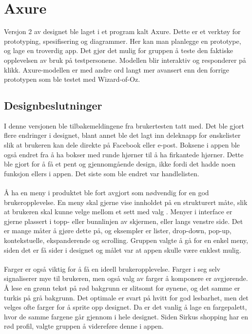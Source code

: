\section{\textcolor[HTML]{D32F2F}{Axure}}
Versjon 2 av designet ble laget i et program kalt Axure. Dette er et verktøy for prototyping, spesifisering og diagrammer. Her kan man planlegge en prototype, og lage en troverdig app. Det gjør det mulig for gruppen å teste den faktiske opplevelsen av bruk på testpersonene. Modellen blir interaktiv og responderer på klikk. Axure-modellen er med andre ord langt mer avansert enn den forrige prototypen som ble testet med Wizard-of-Oz.

\subsection{Designbeslutninger}
I denne versjonen ble tilbakemeldingene fra brukertesten tatt med. Det ble gjort flere endringer i designet, blant annet ble det lagt inn deleknapp for ønskelister slik at brukeren kan dele direkte på Facebook eller e-post. Boksene i appen ble også endret fra å ha bokser med runde hjørner til å ha firkantede hjørner. Dette ble gjort for å få et pent og gjennomgående design, ikke fordi det hadde noen funksjon ellers i appen. Det siste som ble endret var handlelisten.
\\\\
Å ha en meny i produktet ble fort avgjort som nødvendig for en god brukeropplevelse. En meny skal gjerne vise innholdet på en strukturert måte, slik at brukeren skal kunne velge mellom et sett med valg \cite[s.~166]{preece}. Menyer i interface er gjerne plassert i topp- eller bunnlinjen av skjermen, eller langs venstre side. Det er mange måter å gjøre dette på, og eksempler er lister, drop-down, pop-up, kontekstuelle, ekspanderende og scrolling. Gruppen valgte å gå for en enkel meny, siden det er få sider i designet og målet var at appen skulle være enklest mulig.
\\\\
Farger er også viktig for å få en ideell brukeropplevelse. Farger i seg selv signaliserer mye til brukeren, men også valg av farger å komponere er avgjørende. Å lese en grønn tekst på rød bakgrunn er slitsomt for øynene, og det samme er turkis på grå bakgrunn\cite{esthetics}. Det optimale er svart på hvitt for god lesbarhet, men det velges ofte farger for å sprite opp designet. Da er det vanlig å lage en fargepalett, hvor de samme fargene går gjennom i hele designet. Siden Sirkus shopping har en rød profil, valgte gruppen å videreføre denne i appen.

